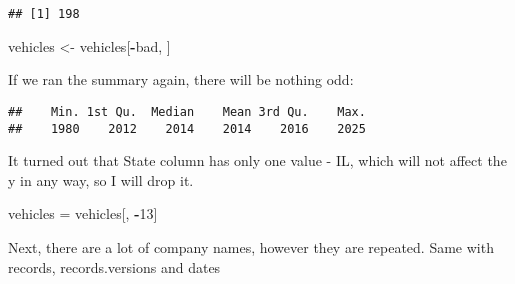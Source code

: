 \documentclass[
]{article}
\newenvironment{Shaded}{\begin{snugshade}}{\end{snugshade}}
\newcommand{\DecValTok}[1]{\textcolor[rgb]{0.00,0.00,0.81}{#1}}
\newcommand{\FunctionTok}[1]{\textcolor[rgb]{0.13,0.29,0.53}{\textbf{#1}}}
\newcommand{\NormalTok}[1]{#1}
\newcommand{\OtherTok}[1]{\textcolor[rgb]{0.56,0.35,0.01}{#1}}
\newcommand{\SpecialCharTok}[1]{\textcolor[rgb]{0.81,0.36,0.00}{\textbf{#1}}}
\begin{document}
\begin{verbatim}
## [1] 198
\end{verbatim}

\begin{Shaded}
\begin{Highlighting}[]
\NormalTok{vehicles }\OtherTok{\textless{}{-}}\NormalTok{ vehicles[}\SpecialCharTok{{-}}\NormalTok{bad, ]}
\end{Highlighting}
\end{Shaded}

If we ran the summary again, there will be nothing odd:

\begin{Shaded}
\end{Shaded}

\begin{verbatim}
##    Min. 1st Qu.  Median    Mean 3rd Qu.    Max. 
##    1980    2012    2014    2014    2016    2025
\end{verbatim}

It turned out that State column has only one value - IL, which will not
affect the y in any way, so I will drop it.

\begin{Shaded}
\begin{Highlighting}[]
\NormalTok{vehicles }\OtherTok{=}\NormalTok{ vehicles[, }\SpecialCharTok{{-}}\DecValTok{13}\NormalTok{]}
\end{Highlighting}
\end{Shaded}

Next, there are a lot of company names, however they are repeated. Same
with records, records.versions and dates
\end{document}
